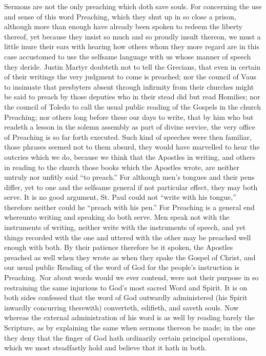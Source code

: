 Sermons are not the only preaching which doth save souls. For concerning the use and sense of this word Preaching, which they shut up in so close a prison, although more than enough have already been spoken to redeem the liberty thereof, yet because they insist so much and so proudly insult thereon, we must a little inure their ears with hearing how others whom they more regard are in this case accustomed to use the selfsame language with us whose manner of speech they deride. Justin Martyr doubteth not to tell the Grecians, that even in certain of their writings the very judgment to come is preached; nor the council of Vaus to insinuate that presbyters absent through infirmity from their churches might be said to preach by those deputies who in their stead did but  read Homilies; nor the council of Toledo to call the usual public reading of the Gospels in the church Preaching; nor others long before these our days to write, that by him who but readeth a lesson in the solemn assembly as part of divine service, the very office of Preaching is so far forth executed. Such kind of speeches were then familiar, those phrases seemed not to them absurd, they would have marvelled to hear the outcries which we do, because we think that the Apostles in writing, and others in reading to the church those books which the Apostles wrote, are neither untruly nor unfitly said “to preach.” For although men’s tongues and their pens differ, yet to one and the selfsame general if not particular effect, they may both serve. It is no good argument, St. Paul could not “write with his tongue,” therefore neither could he “preach with his pen.” For Preaching is a general end whereunto writing and speaking do both serve. Men speak not with the instruments of writing, neither write with the instruments of speech, and yet things recorded with the one and uttered with the other may be preached well enough with both. By their patience therefore be it spoken, the Apostles preached as well when they wrote as when they spake the Gospel of Christ, and our usual public Reading of the word of God for the people’s instruction is Preaching.
Nor about words would we ever contend, were not their purpose in so restraining the same injurious to God’s most sacred Word and Spirit. It is on both sides confessed that the word of God outwardly administered (his Spirit inwardly concurring therewith) converteth, edifieth, and saveth souls. Now whereas the external administration of his word is as well by reading barely the Scripture, as by explaining the same when sermons thereon be made; in the one they deny that the finger of God hath ordinarily certain principal operations, which we most steadfastly hold and believe that it hath in both.

